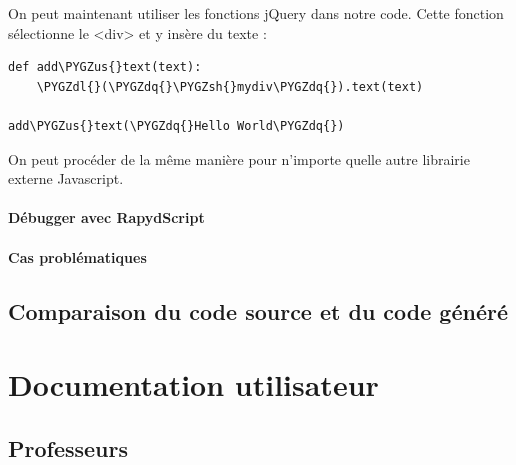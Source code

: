 \documentclass[a4,10pt,french]{sphinxmanual}
\def\PYGZus{\char`\_}
\def\PYGZsh{\char`\#}
\def\PYGZdl{\char`\$}
\def\PYGZdq{\char`\"}
\begin{document}
On peut maintenant utiliser les fonctions jQuery dans notre code. Cette fonction sélectionne le \textless{}div\textgreater{} et y insère du texte :

\begin{Verbatim}[commandchars=\\\{\}]
def add\PYGZus{}text(text):
    \PYGZdl{}(\PYGZdq{}\PYGZsh{}mydiv\PYGZdq{}).text(text)

add\PYGZus{}text(\PYGZdq{}Hello World\PYGZdq{})
\end{Verbatim}

On peut procéder de la même manière pour n'importe quelle autre librairie externe Javascript.


\subsubsection{Débugger avec RapydScript}
\label{rapydscript:debugger-avec-rapydscript}

\subsubsection{Cas problématiques}
\label{rapydscript:cas-problematiques}

\section{Comparaison du code source et du code généré}
\label{rapydscript:comparaison-du-code-source-et-du-code-genere}

\chapter{Documentation utilisateur}
\label{doc-user::doc}\label{doc-user:documentation-utilisateur}

\section{Professeurs}
\label{doc-user:professeurs}
\end{document}
